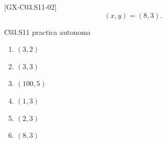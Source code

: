 \begin{shortanswer}{[GX-C03.S11-02]}
\[
(x,y)=(8,3).
\]
\end{shortanswer}

\begin{shortanswer}{C03.S11 practica autonoma}
\begin{enumerate}[label=\textbf{PX-C03.S11-\arabic*:}, leftmargin=*]
  \item \((3,2)\)
  \item \((3,3)\)
  \item \((100,5)\)
  \item \((1,3)\)
  \item \((2,3)\)
  \item \((8,3)\)
\end{enumerate}
\end{shortanswer}
